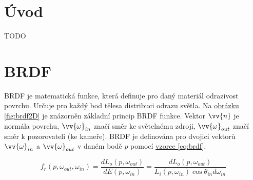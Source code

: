\documentclass[czech,master,dept460,male,cpp,cpdeclaration]{diploma}
\begin{document}
\MakeTitlePages

\section{Úvod}
TODO
\clearpage
\section{BRDF}
BRDF je matematická funkce, která definuje pro daný materiál odrazivost povrchu. Určuje pro každý bod tělesa distribuci odrazu světla. Na \hyperref[fig:brdf2D]{obrázku \ref{fig:brdf2D}} je znázorněn základní princip BRDF funkce. Vektor \(\vv{n}\) je normála povrchu, \(\vv{\omega}_{in}\) značí směr ke světelnému zdroji, \(\vv{\omega}_{out}\) značí směr k pozorovateli (ke kameře). BRDF je definována pro dvojici vektorů  \(\vv{\omega}_{in}\) a \(\vv{\omega}_{out}\) v daném bodě \(p\) pomocí \hyperref[eq:brdf]{vzorce \ref{eq:brdf}}.

\begin{equation} \label{eq:brdf}
    f_r\left(p,\omega_{out},\omega_{in}\right) = \frac{dL_o\left(p, \omega_{out}\right)}{dE\left(p, \omega_{in}\right)} = \frac{dL_o\left(p, \omega_{out}\right)}{L_i\left(p, \omega_{in}\right)\cos \theta_{in}d\omega_{in}}
\end{equation}
\end{document}
